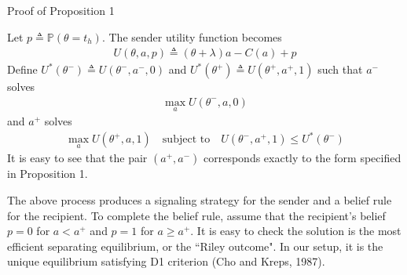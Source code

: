 \documentclass[9pt]{beamer}
\begin{document}
\begin{frame}{Proof of Proposition 1}\label{proof_prop1}

Let $p\triangleq \mathbb{P}(\theta=t_h)$. The sender utility function becomes
\begin{align*}
    U(\theta,a,p)  \triangleq (\theta+\lambda)a-C(a)+p
\end{align*}
Define $U^*(\theta^-) \triangleq U(\theta^-,a^-,0)$ and $U^*(\theta^+) \triangleq U(\theta^+,a^+,1)$ such that $a^-$ solves 
\begin{align*}
    \max_{a} U(\theta^-,a,0)
\end{align*}
and $a^+$ solves
\begin{align*}
    \max_{a} U(\theta^+,a,1)\quad \text{subject to} \quad U(\theta^-,a^+,1)\leq U^*(\theta^-)
\end{align*}
It is easy to see that the pair $(a^+,a^-)$ corresponds exactly to the form specified in Proposition 1.
\vspace{1em}

The above process produces a signaling strategy for the sender and a belief rule for the recipient. To complete the belief rule, assume that the recipient's belief $p = 0$ for $a<a^+$ and $p=1$ for $a\geq a^+$. It is easy to check the solution is the most efficient separating equilibrium, or the ``Riley outcome". In our setup, it is the unique equilibrium satisfying D1 criterion (Cho and Kreps, 1987). 
\end{frame}
\end{document}
